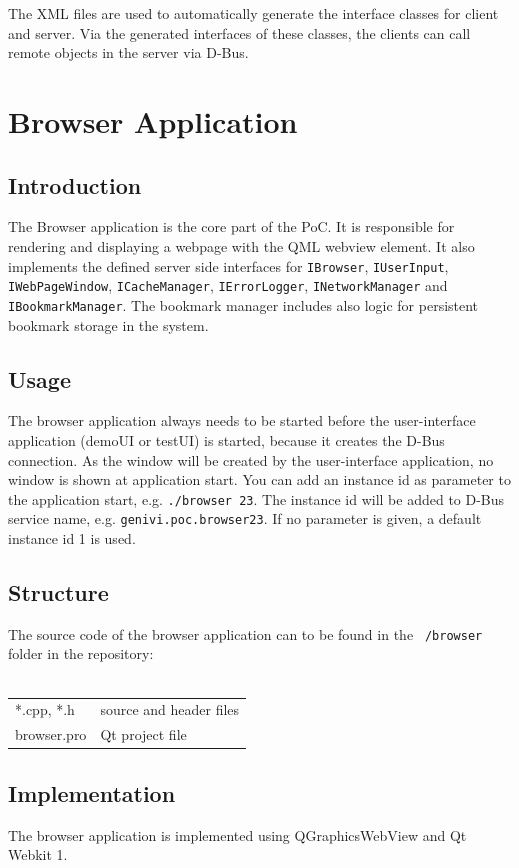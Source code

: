 \documentclass{pelagicore}
\begin{document}
The XML files are used to automatically generate the interface classes for
client and server. Via the generated interfaces of these classes, the clients
can call remote objects in the server via D-Bus.

\section{Browser Application}
\subsection{Introduction}
The Browser application is the core part of the PoC. It is responsible for
rendering and displaying a webpage with the QML webview element. It also
implements the defined server side interfaces for \texttt{IBrowser}, {\tt IUserInput},
{\tt IWebPageWindow}, {\tt ICacheManager}, {\tt IErrorLogger}, {\tt INetworkManager} and {\tt IBookmarkManager}. The bookmark manager includes also
logic for persistent bookmark storage in the system.

\subsection{Usage}
The browser application always needs to be started before the user-interface
application (demoUI or testUI) is started, because it creates the D-Bus
connection. As the window will be created by the user-interface application, no
window is shown at application start.  You can add an instance id as parameter
to the application start, e.g. {\tt ./browser 23}. The instance id will be
added to D-Bus service name, e.g. {\tt genivi.poc.browser23}. If no parameter
is given, a default instance id 1 is used.

\subsection{Structure}
The source code of the browser application can to be found in the {\tt
/browser} folder in the repository:
\\\\
\begin{tabular}{l l}
    *.cpp, *.h         & source and header files \\
    browser.pro        & Qt project file
\end{tabular}

\subsection{Implementation}
The browser application is implemented using QGraphicsWebView and Qt Webkit 1.
\end{document}
